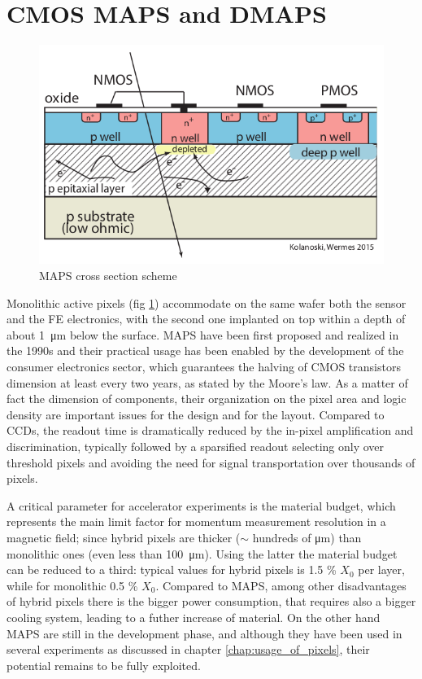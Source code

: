    \section{CMOS MAPS and DMAPS}\label{sec:MAPS_DMAPS}
   \begin{figure}[b]
      \centering
      \includegraphics[width=0.5\linewidth]{figures/Pixel_detectors/MAPS_scheme.png}  
      \caption{MAPS cross section scheme}
      \label{fig:MAPS_scheme}
   \end{figure}
   Monolithic active pixels (fig \ref{fig:MAPS_scheme}) accommodate on the same wafer both the sensor and the FE electronics, with the second one implanted on top within a depth of about \SI{1}{\um} below the surface. 
   MAPS have been first proposed and realized in the 1990s and their practical usage has been enabled by the development of the consumer electronics sector, which guarantees the halving of CMOS transistors dimension at least every two years, as stated by the Moore's law.
   As a matter of fact the dimension of components, their organization on the pixel area and logic density are important issues for the design and for the layout.
   Compared to CCDs, the readout time is dramatically reduced by the in-pixel amplification and discrimination, typically followed by a sparsified readout selecting only over threshold pixels and avoiding the need for signal transportation over thousands of pixels.

   A critical parameter for accelerator experiments is the material budget, which represents the main limit factor for momentum measurement resolution in a magnetic field; since hybrid pixels are thicker ($\sim$ hundreds of \si{\um}) than monolithic ones (even less than \SI{100}{\um}). Using the latter the material budget can be reduced to a third: typical values for hybrid pixels is 1.5 \% $X_0$ per layer, while for monolithic 0.5 \% $X_0$. Compared to MAPS, among other disadvantages of hybrid pixels there is the bigger power consumption, that requires also a bigger cooling system, leading to a futher increase of material.
   On the other hand MAPS are still in the development phase, and although they have been used in several experiments as discussed in chapter \ref{chap:usage_of_pixels}, their potential remains to be fully exploited.

